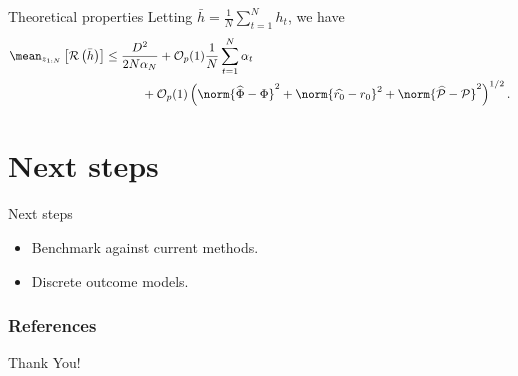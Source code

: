\documentclass[aspectratio=169]{beamer}
\begin{document}
    \begin{frame}{Theoretical properties}
        Letting $ \bar{ h } = \frac{ 1 }{ N } \sum_{ t=1 }^{ N } h_{ t } $, we have
        \begin{align*}
            \begin{split}
                \mean_{ z_{ 1:N } } \left[
                    \risk \left(
                        \bar{ h }
                    \right)
                \right]
                &\leq \frac{ D^2 }{ 2 N \alpha_{ N } }
                + \mathcal{O}_{ p } ( 1 ) \frac{ 1 }{ N } \sum_{ t=1 }^{ N } \alpha_{ t } \\
                &\quad\quad\quad
                + \mathcal{O}_{ p } ( 1 ) \left(
                    \norm{ \hat{ \Phi } - \Phi }^2
                    + \norm{ \hat{ r_{ 0 } } - r_{ 0 } }^2
                    + \norm{ \hat{ \meanop } - \meanop }^2
                \right)^{ 1/2 }.
            \end{split}
        \end{align*}
    \end{frame}

    \section{Next steps}

    \begin{frame}{Next steps}
        \begin{itemize}
            \item<1-> Benchmark against current methods.
            \item<1-> Discrete outcome models.
        \end{itemize}
    \end{frame}

    \begin{frame}
        \frametitle{References}
        \nocite{*}
        \printbibliography
    \end{frame}

    \begin{frame}
        \centering Thank You!
    \end{frame}
\end{document}
